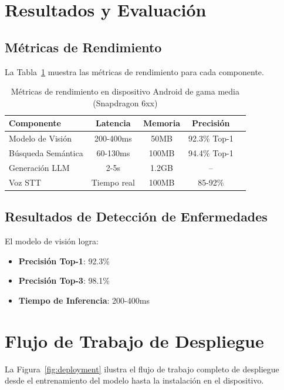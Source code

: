 \documentclass[11pt,a4paper]{article}
\begin{document}
\section{Resultados y Evaluación}

\subsection{Métricas de Rendimiento}

La Tabla~\ref{tab:performance} muestra las métricas de rendimiento para cada componente.

\begin{table}[H]
    \centering
    \caption{Métricas de rendimiento en dispositivo Android de gama media (Snapdragon 6xx)}
    \label{tab:performance}
    \begin{tabular}{@{}lcccc@{}}
        \toprule
        \textbf{Componente} & \textbf{Latencia} & \textbf{Memoria} & \textbf{Precisión} \\
        \midrule
        Modelo de Visión & 200-400ms & 50MB & 92.3\% Top-1 \\
        Búsqueda Semántica & 60-130ms & 100MB & 94.4\% Top-1 \\
        Generación LLM & 2-5s & 1.2GB & -- \\
        Voz STT & Tiempo real & 100MB & 85-92\% \\
        \bottomrule
    \end{tabular}
\end{table}

\subsection{Resultados de Detección de Enfermedades}

El modelo de visión logra:
\begin{itemize}
    \item \textbf{Precisión Top-1}: 92.3\%
    \item \textbf{Precisión Top-3}: 98.1\%
    \item \textbf{Tiempo de Inferencia}: 200-400ms
\end{itemize}

\section{Flujo de Trabajo de Despliegue}

La Figura~\ref{fig:deployment} ilustra el flujo de trabajo completo de despliegue desde el entrenamiento del modelo hasta la instalación en el dispositivo.
\end{document}

